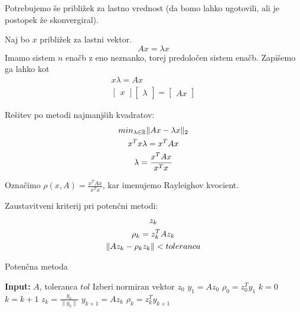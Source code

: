 \documentclass[a4paper,12pt]{article}
\DeclarePairedDelimiter\norm{\lVert}{\rVert}
\theoremstyle{definition}
\theoremstyle{remark}
\newcommand{\R}{\mathbb{R}}
\begin{document}

Potrebujemo še približek za lastno vrednost (da bomo lahko ugotovili, ali je postopek že skonvergiral).

Naj bo $x$ približek za lastni vektor.
\begin{equation*}
    Ax = \lambda x
\end{equation*}
Imamo sistem $n$ enačb z eno neznanko, torej predoločen sistem enačb. Zapišemo ga lahko kot
\begin{gather*} %
    x \lambda = A x \\
    \begin{bmatrix}
        x
    \end{bmatrix} \begin{bmatrix}
        \lambda
    \end{bmatrix} = \begin{bmatrix}
        Ax
    \end{bmatrix}
\end{gather*}

Rešitev po metodi najmanjših kvadratov:
\begin{gather*}
    min_{\lambda \in \R} \norm{Ax - \lambda x}_2 \\
    x^T x \lambda = x^T A x \\
    \lambda = \frac{x^T A x}{x^T x}
\end{gather*}

Označimo $\rho (x, A) = \frac{x^T A x}{x^T x}$, kar imenujemo Rayleighov kvocient.

Zaustavitveni kriterij pri potenčni metodi:
\begin{gather*}
    z_k \\
    \rho_k = z_k^T A z_k \\
    \norm{A z_k - \rho_k z_k} < toleranca
\end{gather*}



\begin{algorithm}
    \caption{Potenčna metoda}
    \begin{algorithmic}[1]
    \State \textbf{Input:} $A$, toleranca $tol$
    \State Izberi normiran vektor $z_0$
    \State $y_1 = A z_0$
    \State $\rho_0 = z_0^T y_1$
    \State $k = 0$
        \State $k = k + 1$
        \State $z_k = \frac{y_k}{\|y_k\|}$
        \State $y_{k+1} = A z_k$
        \State $\rho_k = z_k^T y_{k+1}$
    \EndWhile
    \end{algorithmic}
\end{algorithm}
\end{document}
